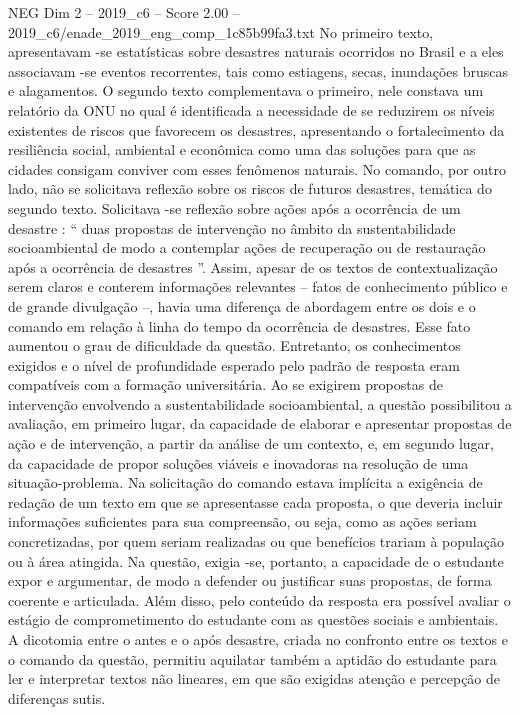 \begin{textsample}{NEG Dim 2 – 2019\_c6 – Score 2.00 – 2019\_c6/enade\_2019\_eng\_comp\_1c85b99fa3.txt}
No primeiro texto, apresentavam -se estatísticas sobre desastres naturais ocorridos no Brasil e a eles associavam -se eventos recorrentes, tais como estiagens, secas, inundações bruscas e alagamentos.
O segundo texto complementava o primeiro, nele constava um relatório da ONU no qual é identificada a necessidade de se reduzirem os níveis existentes de riscos que favorecem os desastres, apresentando o fortalecimento da resiliência social, ambiental e econômica como uma das soluções para que as cidades consigam conviver com esses fenômenos naturais.
No comando, por outro lado, não se solicitava reflexão sobre os riscos de futuros desastres, temática do segundo texto.
Solicitava -se reflexão sobre ações após a ocorrência de um desastre : “ duas propostas de intervenção no âmbito da sustentabilidade socioambiental de modo a contemplar ações de recuperação ou de restauração após a ocorrência de desastres ”.
Assim, apesar de os textos de contextualização serem claros e conterem informações relevantes – fatos de conhecimento público e de grande divulgação –, havia uma diferença de abordagem entre os dois e o comando em relação à linha do tempo da ocorrência de desastres.
Esse fato aumentou o grau de dificuldade da questão.
Entretanto, os conhecimentos exigidos e o nível de profundidade esperado pelo padrão de resposta eram compatíveis com a formação universitária.
Ao se exigirem propostas de intervenção envolvendo a sustentabilidade socioambiental, a questão possibilitou a avaliação, em primeiro lugar, da capacidade de elaborar e apresentar propostas de ação e de intervenção, a partir da análise de um contexto, e, em segundo lugar, da capacidade de propor soluções viáveis e inovadoras na resolução de uma situação-problema.
Na solicitação do comando estava implícita a exigência de redação de um texto em que se apresentasse cada proposta, o que deveria incluir informações suficientes para sua compreensão, ou seja, como as ações seriam concretizadas, por quem seriam realizadas ou que benefícios trariam à população ou à área atingida.
Na questão, exigia -se, portanto, a capacidade de o estudante expor e argumentar, de modo a defender ou justificar suas propostas, de forma coerente e articulada.
Além disso, pelo conteúdo da resposta era possível avaliar o estágio de comprometimento do estudante com as questões sociais e ambientais.
A dicotomia entre o antes e o após desastre, criada no confronto entre os textos e o comando da questão, permitiu aquilatar também a aptidão do estudante para ler e interpretar textos não lineares, em que são exigidas atenção e percepção de diferenças sutis.

\end{textsample}
